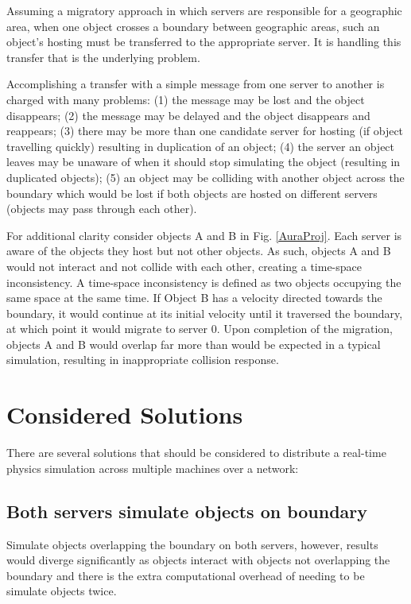 Assuming a migratory approach in which servers are responsible for a geographic area, when one object crosses a boundary between geographic areas, such an object's hosting must be transferred to the appropriate server. It is handling this transfer that is the underlying problem.

Accomplishing a transfer with a simple message from one server to another is charged with many problems: (1) the message may be lost and the object disappears; (2) the message may be delayed and the object disappears and reappears; (3) there may be more than one candidate server for hosting (if object travelling quickly) resulting in duplication of an object; (4) the server an object leaves may be unaware of when it should stop simulating the object (resulting in duplicated objects)\cite{High-performanceServerSystems}; (5) an object may be colliding with another object across the boundary which would be lost if both objects are hosted on different servers (objects may pass through each other).

For additional clarity consider objects A and B in Fig. \ref{AuraProj}. Each server is aware of the objects they host but not other objects. As such, objects A and B would not interact and not collide with each other, creating a time-space inconsistency. A time-space inconsistency is defined as two objects occupying the same space at the same time. If Object B has a velocity directed towards the boundary, it would continue at its initial velocity until it traversed the boundary, at which point it would migrate to server 0. Upon completion of the migration, objects A and B would overlap far more than would be expected in a typical simulation, resulting in inappropriate collision response.

\section{Considered Solutions}
There are several solutions that should be considered to distribute a real-time physics simulation across multiple machines over a network:

\subsection{Both servers simulate objects on boundary}
Simulate objects overlapping the boundary on both servers, however, results would diverge significantly as objects interact with objects not overlapping the boundary and there is the extra computational overhead of needing to be simulate objects twice.

